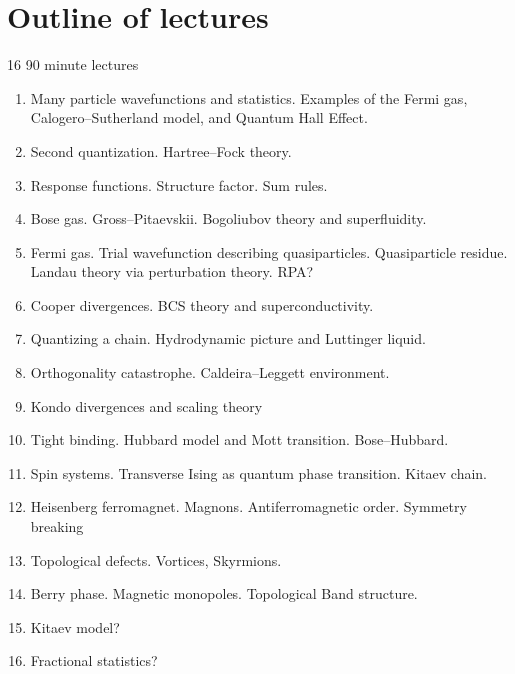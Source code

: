 \section{Outline of lectures}

16 90 minute lectures

\begin{enumerate}
\item Many particle wavefunctions and statistics. Examples of the Fermi gas, Calogero--Sutherland model, and Quantum Hall Effect.

\item Second quantization. Hartree--Fock theory.

\item Response functions. Structure factor. Sum rules. 

\item Bose gas. Gross--Pitaevskii. Bogoliubov theory and superfluidity.

\item Fermi gas. Trial wavefunction describing quasiparticles. Quasiparticle residue. Landau theory via perturbation theory. RPA?

\item Cooper divergences. BCS theory and superconductivity. 

\item Quantizing a chain. Hydrodynamic picture and Luttinger liquid.

\item Orthogonality catastrophe. Caldeira--Leggett environment.

\item Kondo divergences and scaling theory

\item Tight binding. Hubbard model and Mott transition. Bose--Hubbard.

\item Spin systems. Transverse Ising as quantum phase transition. Kitaev chain.

\item Heisenberg ferromagnet. Magnons. Antiferromagnetic order. Symmetry breaking

\item Topological defects. Vortices, Skyrmions. 

\item Berry phase. Magnetic monopoles. Topological Band structure.

\item Kitaev model?

\item Fractional statistics?
\end{enumerate}